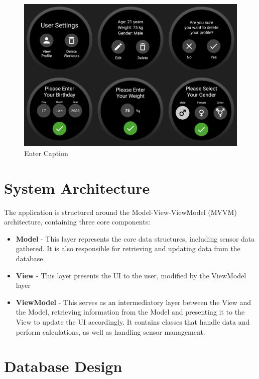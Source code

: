 \documentclass{l4proj}
\begin{document}
\begin{figure}[h!]
    \centering
    \includegraphics[width=1\linewidth]{dissertation//dissImages/UserSettingsCombined.png}
    \caption{Enter Caption}
    \label{fig:enter-label}
\end{figure}

\section{System Architecture}
\label{sec:systemarch}

The application is structured around the Model-View-ViewModel (MVVM) architecture, containing three core components:

\begin{itemize}
    \item \textbf{Model} - This layer represents the core data structures, including sensor data gathered. It is also responsible for retrieving and updating data from the database.
    \item \textbf{View} - This layer presents the UI to the user, modified by the ViewModel layer
    \item \textbf{ViewModel} - This serves as an intermediatory layer between the View and the Model, retrieving information from the Model and presenting it to the View to update the UI accordingly. It contains classes that handle data and perform calculations, as well as handling sensor management.
\end{itemize}

\section{Database Design}
\label{sec:databasedesign}
\end{document}

